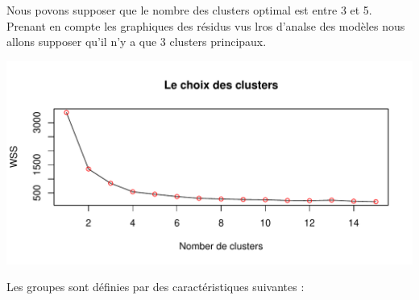 \documentclass[11pt,]{article}
\begin{document}
Nous povons supposer que le nombre des clusters optimal est entre 3 et
5. Prenant en compte les graphiques des résidus vus lros d'analse des
modèles nous allons supposer qu'il n'y a que 3 clusters principaux.

\FloatBarrier

\begin{center}\includegraphics{note2pres_files/figure-latex/unnamed-chunk-94-1} \end{center}

\FloatBarrier

Les groupes sont définies par des caractéristiques suivantes :

\FloatBarrier
\end{document}
